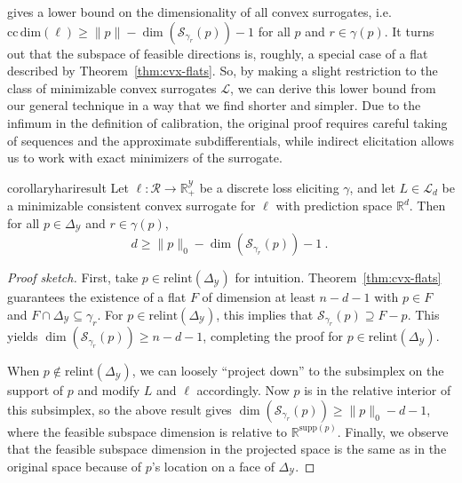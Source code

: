 \documentclass{article}
\newcommand{\Comments}{1}
\newcommand{\mynote}[2]{\ifnum\Comments=1\textcolor{#1}{#2}\fi}
\newcommand{\mytodo}[2]{\ifnum\Comments=1%
	\todo[linecolor=#1!80!black,backgroundcolor=#1,bordercolor=#1!80!black]{#2}\fi}
\newcommand{\raft}[1]{\mytodo{green!20!white}{RF: #1}}
\newcommand{\jessiet}[1]{\mytodo{purple!20!white}{JF: #1}}
\newcommand{\bo}[1]{\mynote{blue}{[Bo: #1]}}
\newcommand{\btw}[1]{\mytodo{gray!10!white}{\textcolor{gray}{BTW: #1}}}%
\newcommand{\reals}{\mathbb{R}}
\newcommand{\simplex}{\Delta_\Y}
\newcommand{\relint}[1]{\mathrm{relint}(#1)}
\newcommand{\ccdim}{\mathrm{cc\,dim}}
\newcommand{\supp}{\mathrm{supp}}
\renewcommand{\L}{\mathcal{L}}
\newcommand{\R}{\mathcal{R}}
\newcommand{\Sc}{\mathcal{S}}  %
\newcommand{\Y}{\mathcal{Y}}
\begin{document}
\citet{ramaswamy2016convex} gives a lower bound on the dimensionality of all convex surrogates, i.e. $\ccdim(\ell) \geq \|p\| - \dim(\Sc_{\gamma_r}(p)) - 1$ for all $p$ and $r \in \gamma(p)$.
It turns out that the subspace of feasible directions is, roughly, a special case of a flat described by Theorem~\ref{thm:cvx-flats}.
So, by making a slight restriction to the class of minimizable convex surrogates $\L$, we can derive this lower bound from our general technique in a way that we find shorter and simpler.
Due to the infimum in the definition of calibration, the original proof requires careful taking of sequences and the approximate subdifferentials, while indirect elicitation allows us to work with exact minimizers of the surrogate.

\begin{restatable}{corollary}{hariresult}\label{cor:fsd-bound}
	Let $\ell:\R \to \reals^\Y_+$ be a discrete loss eliciting $\gamma$, and let $L \in \L_d$ be a minimizable consistent convex surrogate for $\ell$ with prediction space $\reals^d$.
	Then for all $p \in \simplex$ and $r \in \gamma(p)$,
	\begin{equation}
	  d \geq \|p\|_0 - \dim(\Sc_{\gamma_r}(p)) - 1~.~
	\end{equation}
\end{restatable}
\begin{proof}[Proof sketch]
	First, take $p \in \relint{\simplex}$ for intuition.
	Theorem~\ref{thm:cvx-flats} guarantees the existence of a flat $F$ of dimension at least $n-d-1$ with $p \in F$ and $F \cap \simplex \subseteq \gamma_r$.
	For $p \in \relint{\simplex}$, this implies that $\Sc_{\gamma_r}(p) \supseteq F - p$.
	This yields $\dim(\Sc_{\gamma_r}(p)) \geq n - d - 1$, completing the proof for $p \in \relint{\simplex}$.
	
	When $p \not \in \relint{\simplex}$, we can loosely ``project down'' to the subsimplex on the support of $p$ and modify $L$ and $\ell$ accordingly.
	Now $p$ is in the relative interior of this subsimplex, so the above result gives $\dim(\Sc_{\gamma_r}(p)) \geq \|p\|_0 - d - 1$, where the feasible subspace dimension is relative to $\reals^{\supp(p)}$.
	Finally, we observe that the feasible subspace dimension in the projected space is the same as in the original space because of $p$'s location on a face of $\simplex$.
\end{proof}
\end{document}
